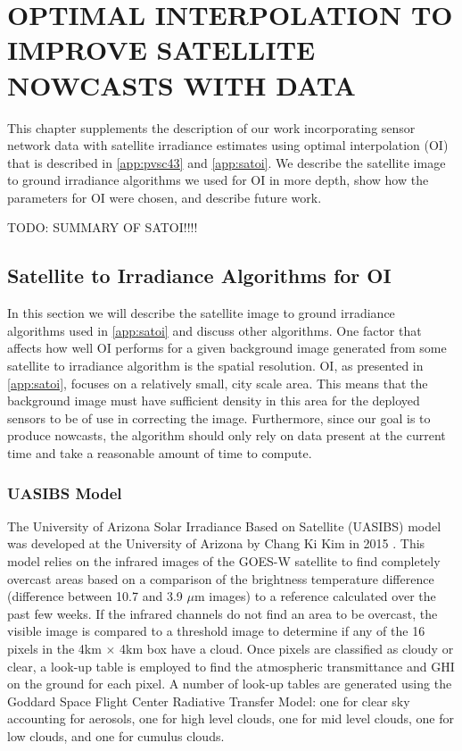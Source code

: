 \chapter{OPTIMAL INTERPOLATION TO IMPROVE SATELLITE NOWCASTS WITH DATA}
\label{chap:satoi}

This chapter supplements the description of our work incorporating
sensor network data with satellite irradiance estimates using optimal
interpolation (OI) that is described in \cref{app:pvsc43} and
\cref{app:satoi}.
We describe the satellite image to ground irradiance algorithms we
used for OI in more depth, show how the parameters for OI were chosen,
and describe future work.

TODO: SUMMARY OF SATOI!!!!

\section{Satellite to Irradiance Algorithms for OI}
In this section we will describe the satellite image to ground
irradiance algorithms used in \cref{app:satoi} and discuss other
algorithms.
One factor that affects how well OI performs for a given background
image generated from some satellite to irradiance algorithm is the
spatial resolution.
OI, as presented in \cref{app:satoi}, focuses on a relatively small,
city scale area.
This means that the background image must have sufficient density in
this area for the deployed sensors to be of use in correcting the
image.
Furthermore, since our goal is to produce nowcasts, the algorithm
should only rely on data present at the current time and take a
reasonable amount of time to compute.

\subsection{UASIBS Model}

The University of Arizona Solar Irradiance Based on Satellite (UASIBS)
model was developed at the University of Arizona by Chang Ki Kim in
2015 \citep{Kim2016}.
This model relies on the infrared images of the GOES-W satellite to
find completely overcast areas based on a comparison of the brightness
temperature difference (difference between 10.7 and 3.9 $\mu$m
images) to a reference calculated over the past few weeks.
If the infrared channels do not find an area to be overcast, the
visible image is compared to a threshold image to determine if any of
the 16 pixels in the 4km $\times$ 4km box have a cloud.
Once pixels are classified as cloudy or clear, a look-up table is
employed to find the atmospheric transmittance and GHI on the ground
for each pixel.
A number of look-up tables are generated using the Goddard Space
Flight Center Radiative Transfer Model: one for clear sky
accounting for aerosols, one for high level clouds, one for mid level
clouds, one for low clouds, and one for cumulus clouds.


